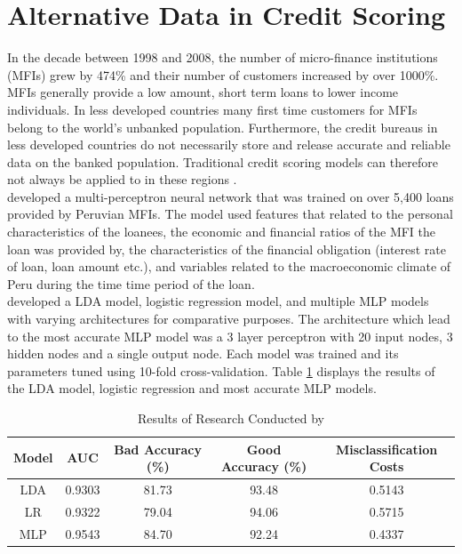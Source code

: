 
\section{Alternative Data in Credit Scoring}


In the decade between 1998 and 2008, the number of micro-finance institutions (MFIs) grew by 474\% and their number of customers increased by over 1000\%. MFIs generally provide a low amount, short term loans to lower income individuals. In less developed countries many first time customers for MFIs belong to the world's unbanked population. Furthermore, the credit bureaus in less developed countries do not necessarily store and release accurate and reliable data on the banked population. Traditional credit scoring models can therefore not always be applied to in these regions \parencite{MFICinca}.  \\


\textcite{MFIMLP} developed a multi-perceptron neural network that was trained on over 5,400 loans provided by Peruvian MFIs. The model used features that related to the personal characteristics of the loanees, the economic and financial ratios of the MFI the loan was provided by, the characteristics of the financial obligation (interest rate of loan, loan amount etc.), and variables related to the macroeconomic climate of Peru during the time time period of the loan. \\


\textcite{MFIMLP} developed a LDA model, logistic regression model, and multiple MLP models with varying architectures for comparative purposes. The architecture which lead to the most accurate MLP model was a 3 layer perceptron with 20 input nodes, 3 hidden nodes and a single output node. Each model was trained and its parameters tuned using 10-fold cross-validation. Table \ref{table:MFIMLP} displays the results of the LDA model, logistic regression and most accurate MLP models. 

\vspace{15pt}

\begin{table}[H]
\begin{center}
\begin{tabular}{|c|c|c|c|c|} 
\hline
\multicolumn{1}{|c}{Model}  &\multicolumn{1}{|c|}{AUC}  &\multicolumn{1}{|c|}{Bad Accuracy (\%)} & \multicolumn{1}{c|}{Good Accuracy (\%)} & \multicolumn{1}{c|}{Misclassification Costs}\\
\hline
LDA  & 0.9303 &  81.73 & 93.48 & 0.5143 \\
\hline
LR & 0.9322 & 79.04 & 94.06  & 0.5715 \\
\hline
MLP & 0.9543 & 84.70 & 92.24 & 0.4337 \\
\hline
\end{tabular}
\end{center}
\caption{Results of Research Conducted by \textcite{MFIMLP}}
\label{table:MFIMLP}
\end{table}

